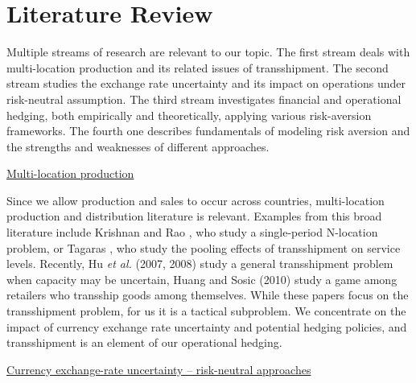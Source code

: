 \documentclass[mnsc,nonblindrev,copyedit]{informs2_wz} %
\newcommand{\mnin}{\medskip \noindent}
\newcommand{\nin}{\noindent}
\begin{document}
\section{Literature Review \label{sect:liter}}

Multiple streams of research are relevant to our topic.  The first stream deals with multi-location production and its related issues of transshipment. The second stream studies the exchange rate uncertainty and its impact on operations under risk-neutral assumption. The third stream investigates financial and operational hedging, both empirically and theoretically, applying various risk-aversion frameworks. The fourth one describes fundamentals of modeling risk aversion and the strengths and weaknesses of different approaches. 


\mnin \underline{Multi-location production}

\nin Since we allow production and sales to occur across countries, multi-location production and distribution literature is relevant.  Examples from this broad literature include Krishnan and Rao \cite{Krishnan1965}, who study a single-period N-location problem, or Tagaras \cite{Tagaras1992}, who study the pooling effects of transshipment on service levels. Recently, Hu {\it et al.} (2007, 2008) study a general transshipment problem when capacity may be uncertain, Huang and Sosic (2010) study a game among retailers who transship goods among themselves.  While these papers focus on the transshipment problem, for us it is a tactical subproblem.  We concentrate on the impact of currency exchange rate uncertainty and potential hedging policies, and transshipment is an element of our operational hedging.


\mnin \underline{Currency exchange-rate uncertainty -- risk-neutral approaches} 
\end{document}
